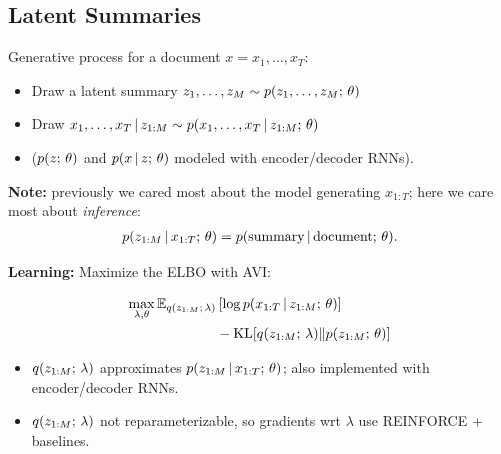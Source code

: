 \subsection{Latent Summaries}

\begin{frame}
Generative process for a document $x = x_1, \ldots, x_T$:
\begin{itemize}
    \item Draw a latent summary $z_1, \ldots, z_{M} \sim p(z_1, \ldots, z_{M} ; \, \theta)$
    \item Draw $x_1, \ldots, x_{T} \,|\, z_{1:M} \sim p(x_1, \ldots, x_T \,|\, z_{1:M} ; \, \theta)$
    \item ($p(z ; \, \theta)$ and $p(x \,|\, z ; \, \theta)$ modeled with encoder/decoder RNNs).
\end{itemize}

    
\air
\air
\air
\pause
\textbf{Note:} previously we cared most about the model generating $x_{1:T}$; here we care most about \textit{inference}: 
\begin{align*}
p(z_{1:M} \,|\, x_{1:T} ; \, \theta) = p(\text{summary} \,|\, \text{document} ; \, \theta).    
\end{align*}
\end{frame}

\begin{frame}
\textbf{Learning:} Maximize the ELBO with AVI:

\begin{align*}
    \max_{\lambda, \theta} \mathbb{E}_{q(z_{1:M} ; \, \lambda)} &\left[\log p(x_{1:T} \,|\, z_{1:M} ; \, \theta) \right] \\
    &- \operatorname*{KL}[q(z_{1:M} ; \, \lambda) \Vert p(z_{1:M} ; \, \theta)]
\end{align*}

\begin{itemize}
    \item $q(z_{1:M} ; \, \lambda)$ approximates $p(z_{1:M} \,|\, x_{1:T} ; \, \theta)$; also implemented with encoder/decoder RNNs.
    \item $q(z_{1:M} ; \, \lambda)$ not reparameterizable, so gradients wrt $\lambda$ use REINFORCE + baselines.
\end{itemize}

\end{frame}

